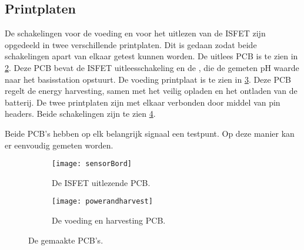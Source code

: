 \begin{figure}
    \centering

    \label{}
\end{figure}


\subsection{Printplaten}
De schakelingen voor de voeding en voor het uitlezen van de ISFET zijn opgedeeld in twee verschillende printplaten. Dit is gedaan zodat beide schakelingen apart van elkaar getest kunnen worden. De uitlees PCB is te zien in \cref{fig:sensorPCB}. Deze PCB bevat de ISFET uitleesschakeling en de \mcu, die de gemeten pH waarde naar het basisstation opstuurt. De voeding printplaat is te zien in \cref{fig:powerPCB}. Deze PCB regelt de energy harvesting, samen met het veilig opladen en het ontladen van de batterij. De twee printplaten zijn met elkaar verbonden door middel van pin headers. Beide schakelingen zijn te zien \cref{fig:PCBs}.

Beide PCB's hebben op elk belangrijk signaal een testpunt. Op deze manier kan er eenvoudig gemeten worden.


\begin{figure}[!htbp]
    \centering
    \begin{subfigure}[b]{0.48\textwidth}
        \centering
        \texttt{[image: sensorBord]}
        \caption{De ISFET uitlezende PCB.}
        \label{fig:sensorPCB}
    \end{subfigure}
    \hfill
    \begin{subfigure}[b]{0.60\textwidth}
        \centering
        \texttt{[image: powerandharvest]}
        \caption{De voeding en harvesting PCB.}
        \label{fig:powerPCB}
    \end{subfigure}
    \caption{De gemaakte PCB's.}
    \label{fig:PCBs}
\end{figure}